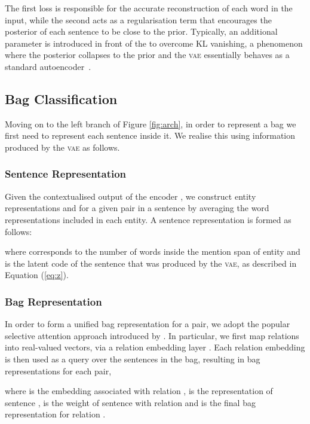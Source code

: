 \documentclass[11pt]{article}
\begin{document}
The first loss is responsible for the accurate reconstruction of each word in the input, while the second acts as a regularisation term that encourages the posterior of each sentence to be close to the prior.
Typically, an additional parameter  is introduced in front of the  to overcome KL vanishing, a phenomenon where the posterior collapses to the prior and the \textsc{vae} essentially behaves as a standard autoencoder~\citep{bowman2016generating}. 



\subsection{Bag Classification}

Moving on to the left branch of Figure \ref{fig:arch}, in order to represent a bag we first need to represent each sentence inside it.
We realise this using information produced by the \textsc{vae} as follows.

\subsubsection{Sentence Representation}
Given the contextualised output of the encoder , we construct entity representations  and  for a given pair in a sentence by averaging the word representations included in each entity.
A sentence representation  is formed as follows: 

where  corresponds to the number of words inside the mention span of entity  and  is the latent code of the sentence that was produced by the \textsc{vae}, as described in Equation (\ref{eq:z}). 




\subsubsection{Bag Representation}
\label{sec:bag_enc}
In order to form a unified bag representation  for a pair, we adopt the popular selective attention approach introduced by \citet{lin2016neural}. 
In particular, we first map relations into real-valued vectors, via a relation embedding layer . 
Each relation embedding is then used as a query over the sentences in the bag, resulting in  bag representations for each pair,  

where  is the embedding associated with relation ,  is the representation of sentence ,  is the weight of sentence  with relation  and  is the final bag representation for relation .
\end{document}

